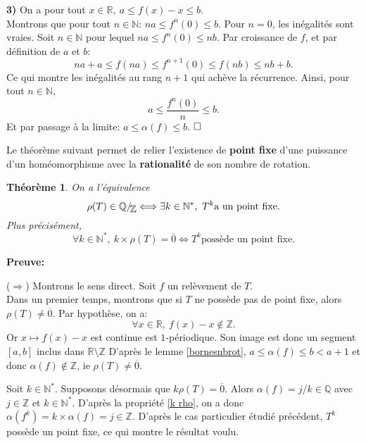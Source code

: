 \documentclass[11pt,a4 paper]{article}
\newtheorem{theoreme}{Théorème}[section]
\newcommand*{\EnsembleQuotient}[2]%
{\ensuremath{%
		#1/\!\raisebox{-.65ex}{\ensuremath{\mathcal{#2}}}}}
\newenvironment{thm}{\begin{box_thm}\begin{theoreme}}{\end{theoreme}\end{box_thm}}
\begin{document}
	\par\textbf{3) }On a pour tout $x \in \mathbb{R},\ a \leq f(x) - x \leq b$.\\ Montrons que pour tout $n \in \mathbb{N}$: $n a \leq f^n(0) \leq b$.
	Pour $n=0$, les inégalités sont vraies. Soit $n\in \mathbb{N}$ pour lequel $na \leq f^n(0) \leq nb$. Par croissance de $f$, et par définition de $a$ et $b$:
	$$na+a \leq f(na)\leq f^{n+1}(0)\leq f(nb) \leq nb +b.$$
	Ce qui montre les inégalités au rang $n+1$ qui achève la récurrence.
	Ainsi, pour tout $n \in \mathbb{N}$,
	$$a\leq \frac{f^n(0)}{n}\leq b.$$
	Et par passage à la limite: $a\leq \alpha(f)\leq b$. $\hfill \square$ \\









\par Le théorème suivant permet de relier l'existence de \textbf{point fixe} d'une puissance d'un homéomorphisme avec la \textbf{rationalité} de son nombre de rotation. 


\begin{thm}\label{equivrationnel}
	On a l'équivalence $$\rho(T) \in \EnsembleQuotient{\mathbb{Q}}{\mathbb{Z}} \Longleftrightarrow \exists k \in \mathbb{N}^*,\ T^k \text{a un point fixe.}$$
	 Plus précisément,
	 $$\forall k \in \mathbb{N}^*,\ k \times \rho(T)=\overline{0} \Longleftrightarrow T^k \text{possède un point fixe.}$$
\end{thm}

	\textbf{Preuve:}
	\par($\Rightarrow$) Montrons le sens direct. Soit $f$ un relèvement de $T$.\\
	Dans un premier temps, montrons que si $T$ ne possède pas de point fixe, alors $\rho(T) \neq \overline{0}$. Par hypothèse, on a: $$ \forall x \in \mathbb{R},\ f(x)-x \notin \mathbb{Z}.$$
	Or $x\mapsto f(x) - x$ est continue est $1$-périodique. Son image est donc un segment $[a,b]$ inclus dans $\mathbb{R} \setminus \mathbb{Z}$
	D'après le lemme \ref{bornesnbrot}, $a \leq \alpha(f) \leq b < a+1$ et donc $\alpha(f) \notin \mathbb{Z}$, ie $\rho(T) \neq \overline{0}$.\\
	\par Soit $k\in \mathbb{N}^*$. Supposons désormais que $k \rho(T)= \overline{0}$. Alors $\alpha(f) = j/k \in \mathbb{Q}$ avec $j \in \mathbb{Z}$ et $k \in \mathbb{N}^*$. D'après la propriété \ref{k rho}, on a donc $\alpha(f^k)=k \times \alpha(f)= j \in \mathbb{Z}$.
	D'après le cas particulier étudié précédent, $T^k$ possède un point fixe, ce qui montre le résultat voulu.\\
\end{document}
